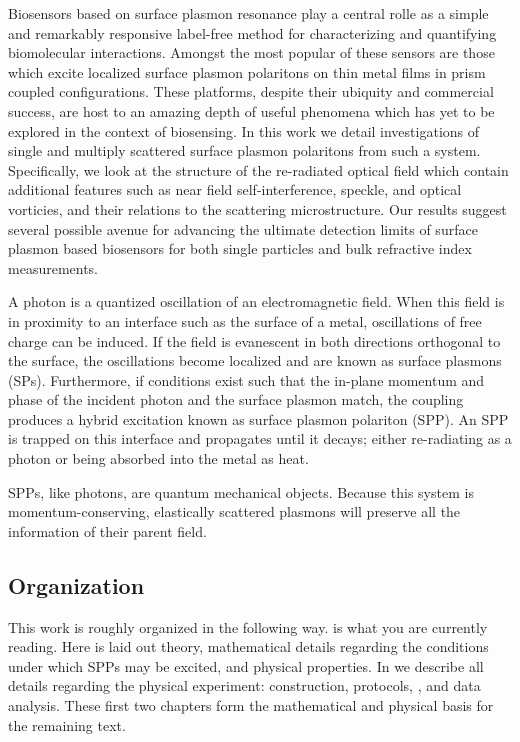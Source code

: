 Biosensors based on surface plasmon resonance play a central rolle as a
simple and remarkably responsive label-free method for characterizing and
quantifying biomolecular interactions.  Amongst the most popular of these
sensors are those which excite localized surface plasmon polaritons on thin
metal films in prism coupled configurations.  These platforms, despite
their ubiquity and commercial success, are host to an amazing depth of
useful phenomena which has yet to be explored in the context of biosensing.
In this work we detail investigations of single and multiply scattered
surface plasmon polaritons from such a system.  Specifically, we look at
the structure of the re-radiated optical field which contain additional
features such as near field self-interference, speckle, and optical
vorticies, and their relations to the scattering microstructure.  Our
results suggest several possible avenue for advancing the ultimate
detection limits of surface plasmon based biosensors for both single
particles and bulk refractive index measurements.

A photon is a quantized oscillation of an electromagnetic field.  When this
field is in proximity to an interface such as the surface of a metal,
oscillations of free charge can be induced.  If the field is evanescent in
both directions orthogonal to the surface, the oscillations become
localized and are known as surface plasmons (SPs).  Furthermore, if
conditions exist such that the in-plane momentum and phase of the incident
photon and the surface plasmon match, the coupling produces a hybrid
excitation known as surface plasmon polariton (SPP).  An SPP is trapped on
this interface and propagates until it decays; either re-radiating as a
photon or being absorbed into the metal as heat.

SPPs, like photons, are quantum mechanical objects.  Because this system is
momentum-conserving, elastically scattered plasmons will preserve all the
information of their parent field.  

\subsection{Organization}
This work is roughly organized in the following way.
 is what you are currently reading.  Here is laid out
theory, mathematical details regarding the conditions under which SPPs may
be excited, and physical properties.  In  we
describe all details regarding the physical experiment: construction,
protocols, , and data analysis.  These first two chapters form the
mathematical and physical basis for the remaining text.

